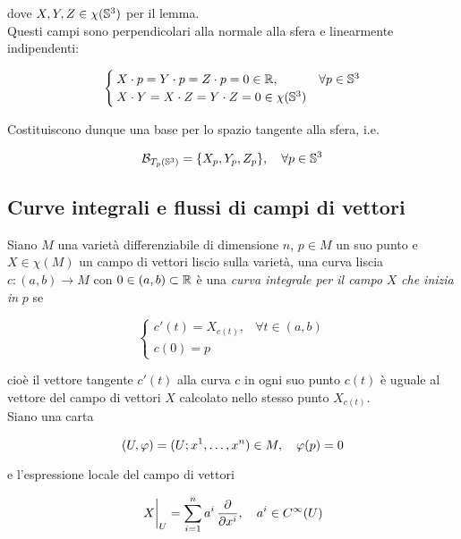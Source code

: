 dove $ X,Y,Z \in \chi(\S^{3}) $ per il lemma. \\
Questi campi sono perpendicolari alla normale alla sfera e linearmente indipendenti:

\begin{equation}
	\begin{cases}
		X \cdot p = Y \cdot p = Z \cdot p = 0 \in \R, & \forall p \in \S^{3} \\
		X \cdot Y = X \cdot Z = Y \cdot Z = 0 \in \chi(\S^{3})
	\end{cases}
\end{equation}

Costituiscono dunque una base per lo spazio tangente alla sfera, i.e.

\begin{equation}
	\B_{T_{p}(\S^{3})} = \{ X_{p}, Y_{p}, Z_{p} \} \qcomma \forall p \in \S^{3}
\end{equation}

\subsection{Curve integrali e flussi di campi di vettori}

Siano $ M $ una varietà differenziabile di dimensione $ n $, $ p \in M $ un suo punto e $ X \in \chi(M) $ un campo di vettori liscio sulla varietà, una curva liscia $ c : (a,b) \to M $ con $ 0 \in (a,b) \subset \R $ è una \textit{curva integrale per il campo} $ X $ \textit{che inizia in} $ p $ se

\begin{equation}
	\begin{cases}
		c'(t) = X_{c(t)}, & \forall t \in (a,b) \\
		c(0) = p
	\end{cases}
\end{equation}

cioè il vettore tangente $ c'(t) $ alla curva $ c $ in ogni suo punto $ c(t) $ è uguale al vettore del campo di vettori $ X $ calcolato nello stesso punto $ X_{c(t)} $. \\
Siano una carta

\begin{equation}
	(U,\varphi) = (U; x^{1},\dots,x^{n}) \in M \qcomma \varphi(p) = 0
\end{equation}

e l'espressione locale del campo di vettori

\begin{equation}
	\eval{X}_{U} = \sum_{i=1}^{n} a^{i} \, \pdv{x^{i}} \qcomma a^{i} \in C^{\infty}(U)
\end{equation}

